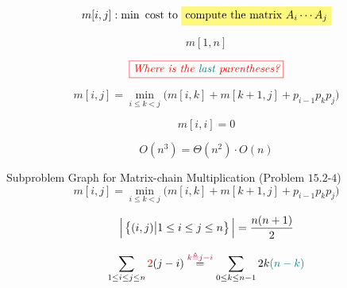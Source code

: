 
\begin{frame}{}
  \centerline{\LARGE {}}

  \vspace{0.50cm}
\end{frame}

\begin{frame}{}
  \[
    m[i,j]: \min \text{ cost to \hl{yellow}{compute the matrix $A_{i} \cdots A_j$}}
  \]

  \[
    m[1,n]
  \]

  \pause
  \[
    \textcolor{red}{\fbox{\it Where is the {\textcolor{teal}{last}} parentheses?}}
  \]

  \pause
  \[
    m[i,j] = \min_{i \le k <j} \Big(m[i,k] + m[k+1,j] + p_{i-1}p_{k}p_{j}\Big)
  \]

  \pause
  \[
    m[i,i] = 0
  \]

  \pause
  \[
    O(n^3) = \Theta(n^2) \cdot O(n)
  \]
\end{frame}

\begin{frame}{}
  \begin{exampleblock}{Subproblem Graph for Matrix-chain Multiplication (Problem $15.2$-$4$)}
    \[
      m[i,j] = \min_{i \le k <j} \Big(m[i,k] + m[k+1,j] + p_{i-1}p_{k}p_{j}\Big)
    \]

  \end{exampleblock}

  \pause
  \[
    \Big\vert \left\{(i,j) \big\vert 1 \le i \le j \le n\right\} \Big\vert = \frac{n (n+1)}{2}
  \]

  \pause
  \[
    \sum_{1 \le i \le j \le n} \textcolor{red}{2}(j - i) \overset{\textcolor{purple}{k \triangleq j-i}}{=} \sum_{0 \le k \le n-1} 2k \textcolor{teal}{(n-k)}
  \]
\end{frame}
